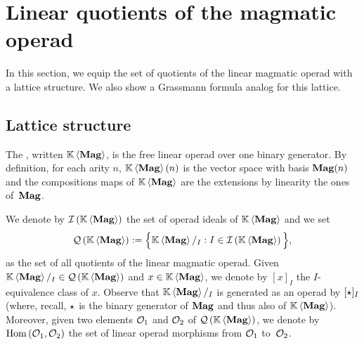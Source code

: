 \section{Linear quotients of the magmatic operad}
\label{sec:Magmatic_operads}
In this section, we equip the set of quotients of the linear magmatic
operad with a lattice structure. We also show a Grassmann formula
analog for this lattice.
\medbreak

\subsection{Lattice structure}
The , written $\KMag$, is the free linear
operad over one binary generator. By definition, for each arity $n$,
$\KMag(n)$ is the vector space with basis $\Mag(n)$ and the
compositions maps of $\KMag$ are the extensions by linearity the ones
of~$\Mag$.
\medbreak

We denote by $\IMag$ the set of operad ideals of $\KMag$ and we set
\begin{equation} \label{equ:definition_of_QMag}
    \QMag := \Big\{\KMag/_I :  I\in\IMag\Big\},
\end{equation}
as the set of all quotients of the linear magmatic operad. Given
$\KMag/_I \in \QMag$ and $x \in \KMag$, we denote by $[x]_I$ the
$I$-equivalence class of $x$. Observe that $\KMag/_I$ is generated as an
operad by $[\Product]_I$ (where, recall, $\Product$ is the binary
generator of $\Mag$ and thus also of $\KMag$). Moreover, given two
elements $\Oca_1$ and $\Oca_2$ of $\QMag$, we denote by
$\Hom\left(\Oca_1,\Oca_2\right)$ the set of linear operad morphisms from
$\Oca_1$ to~$\Oca_2$.
\medbreak


